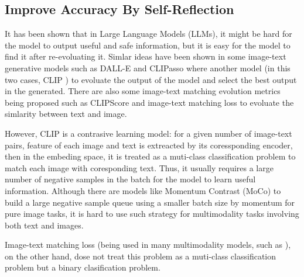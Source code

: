 \documentclass{article}
\begin{document}
\subsection{Improve Accuracy By Self-Reflection}
It has been shown that in Large Language Models (LLMs), it might be hard for the model to output useful and safe information, but it is easy for the model to find it after re-evoluating it. \autocite{bai_constitutional_2022} Simlar ideas have been shown in some image-text generative models such as DALL-E \autocite{ramesh_zero-shot_2021} and CLIPasso \autocite{vinker_clipasso_2022} where another model (in this two cases, CLIP \autocite{radford_learning_2021}) to evoluate the output of the model and select the best output in the generated. There are also some image-text matching evolution metrics being proposed such as CLIPScore \autocite{hessel_clipscore:_2022} and image-text matching loss \autocite{xu_attngan:_2017} to evoluate the simlarity between text and image. 

However, CLIP is a contrasive learning model: for a given number of image-text pairs, feature of each image and text is extreacted by its coressponding encoder, then in the embeding space, it is treated as a muti-class classification problem to match each image with coresponding text. \cite{radford_learning_2021} Thus, it usually requires a large number of negative samples in the batch for the model to learn useful information. \autocite{he_momentum_2020} Although there are models like Momentum Contrast  (MoCo) \autocite{he_momentum_2020} to build a large negative sample queue using a smaller batch size by momentum for pure image tasks, it is hard to use such strategy for multimodality tasks involving both text and images. 

Image-text matching loss (being used in many multimodality models, such as \autocite{li_align_2021} \autocite{liao_evaluation_2023}\autocite{xu_attngan:_2017}), on the other hand, dose not treat this problem as a muti-class classification problem but a binary clasification problem. 


\end{document}
